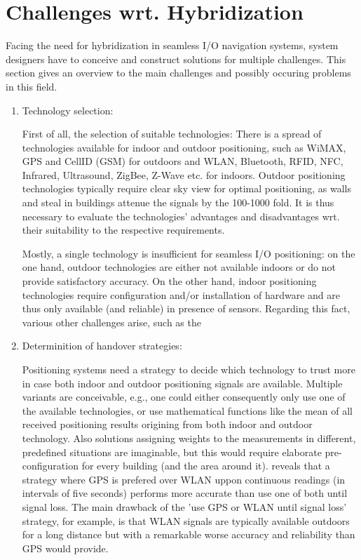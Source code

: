 \chapter{Challenges wrt. Hybridization}

Facing the need for hybridization in seamless I/O navigation systems, system designers have to conceive and construct solutions for multiple challenges. This section gives an overview to the main challenges and possibly occuring problems in this field.

\begin{enumerate}
	\item Technology selection:

	First of all, the selection of suitable technologies: 
	There is a spread of technologies available for indoor and outdoor positioning, such as WiMAX, GPS and CellID (GSM) for outdoors and WLAN, Bluetooth, RFID, NFC, Infrared, Ultrasound, ZigBee, Z-Wave etc. for indoors. Outdoor positioning technologies typically require clear sky view for optimal positioning, as walls and steal in buildings attenue the signals by the 100-1000 fold.
	It is thus necessary to evaluate the technologies' advantages and disadvantages wrt. their suitability to the respective requirements.
	
	Mostly, a single technology is insufficient for seamless I/O positioning: on the one hand, outdoor technologies are either not available indoors or do not provide satisfactory accuracy. On the other hand, indoor positioning technologies require configuration and/or installation of hardware and are thus only available (and reliable) in presence of sensors.
	Regarding this fact, various other challenges arise, such as the

	
	\item Determinition of handover strategies:
	
	Positioning systems need a strategy to decide which technology to trust more in case both indoor and outdoor positioning signals are available. Multiple variants are conceivable, e.g., one could either consequently only use one of the available technologies, or use mathematical functions like the mean of all received positioning results origining from both indoor and outdoor technology. Also solutions assigning weights to the measurements in different, predefined situations are imaginable, but this would require elaborate pre-configuration for every building (and the area around it).
	\cite{streamspin} reveals that a strategy where GPS is prefered over WLAN uppon continuous readings (in intervals of five seconds) performs more accurate than use one of both until signal loss.
	The main drawback of the 'use GPS or WLAN until signal loss' strategy, for example, is that WLAN signals are typically available outdoors for a long distance but with a remarkable worse accuracy and reliability than GPS would provide.
	

\end{enumerate}
